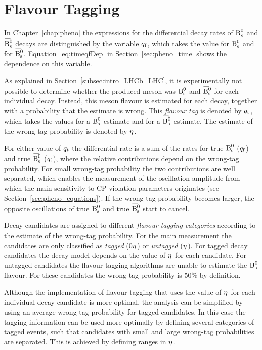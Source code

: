\section{Flavour Tagging}
\label{sec:ana_tagging}

In Chapter~\ref{chap:pheno} the expressions for the differential decay rates of $\text{B}_\text{s}^\text{0}$ and $\Bsbar$ decays are distinguished by the
variable ${q_\mathrm{f}}$, which takes the value  for $\text{B}_\text{s}^\text{0}$ and  for $\Bsbar$. Equation~\ref{eq:timeqfDep} in Section~\ref{sec:pheno_time}
shows the dependence on this variable.

As explained in Section~\ref{subsec:intro_LHCb_LHC}, it is experimentally not possible to determine whether the produced meson was $\text{B}_\text{s}^\text{0}$
and $\Bsbar$ for each individual decay. Instead, this meson flavour is estimated for each decay, together with a probability that the
estimate is wrong. This \emph{flavour tag} is denoted by $q_\mathrm{t}$, which takes the values  for a $\text{B}_\text{s}^\text{0}$ estimate and  for a $\Bsbar$
estimate. The estimate of the wrong-tag probability is denoted by $\eta^{}$.

For either value of $q_\mathrm{t}$ the differential rate is a sum of the rates for true $\text{B}_\text{s}^\text{0}$ (${q_\mathrm{f}}$\texteq{}) and true $\Bsbar$
(${q_\mathrm{f}}$\texteq{}), where the relative contributions depend on the wrong-tag probability. For small wrong-tag probability the two
contributions are well separated, which enables the measurement of the oscillation amplitude from which the main sensitivity to
CP-violation parameters originates (see Section~\ref{sec:pheno_equations}). If the wrong-tag probability becomes larger, the opposite
oscillations of true $\text{B}_\text{s}^\text{0}$ and true $\Bsbar$ start to cancel.

Decay candidates are assigned to different \emph{flavour-tagging categories} according to the estimate of the wrong-tag probability. For
the main measurement the candidates are only classified as \emph{tagged} (0\textlt$\eta^{}$) or \emph{untagged}
($\eta^{}$). For tagged decay candidates the decay model depends on the value of $\eta^{}$ for each candidate. For untagged
candidates the flavour-tagging algorithms are unable to estimate the $\text{B}_\text{s}^\text{0}$ flavour. For these candidates the wrong-tag probability is 50\%
by definition.

Although the implementation of flavour tagging that uses the value of $\eta^{}$ for each individual decay candidate is more optimal, the
analysis can be simplified by using an average wrong-tag probability for tagged candidates. In this case the tagging information can be
used more optimally by defining several categories of tagged events, such that candidates with small and large wrong-tag probabilities are
separated. This is achieved by defining ranges in $\eta^{}$.

